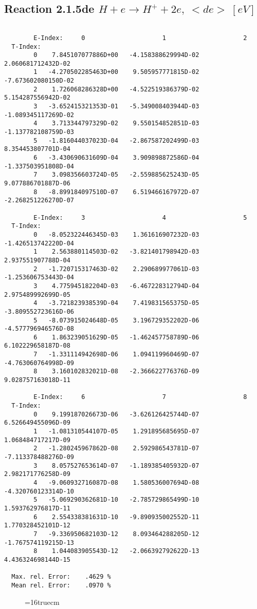 \documentclass[12pt]{article}
\begin{document}
\newpage

\subsection{
Reaction 2.1.5de  $ H + e \rightarrow H^+ + 2e, \   <de> \ [eV]$}


\begin{small}\begin{verbatim}

        E-Index:     0                     1                     2
  T-Index:
        0    7.845107077886D+00   -4.158388629994D-02    2.060681712432D-02
        1   -4.270502285463D+00    9.505957771815D-02   -7.673602080150D-02
        2    1.726068286328D+00   -4.522519386379D-02    5.154287556942D-02
        3   -3.652415321353D-01   -5.349008403944D-03   -1.089345117269D-02
        4    3.713344797329D-02    9.550154852851D-03   -1.137782108759D-03
        5   -1.816044037023D-04   -2.867587202499D-03    8.354453807701D-04
        6   -3.430690631609D-04    3.909898872586D-04   -1.337503951808D-04
        7    3.098356603724D-05   -2.559885625243D-05    9.077886701887D-06
        8   -8.899184097510D-07    6.519466167972D-07   -2.268251226270D-07

        E-Index:     3                     4                     5
  T-Index:
        0   -8.052322446345D-03    1.361616907232D-03   -1.426513742220D-04
        1    2.563880114503D-02   -3.821401798942D-03    2.937551907788D-04
        2   -1.720715317463D-02    2.290689977061D-03   -1.253606753443D-04
        3    4.775945182204D-03   -6.467228312794D-04    2.975489992699D-05
        4   -3.721823938539D-04    7.419831565375D-05   -3.809552723616D-06
        5   -8.073915024648D-05    3.196729352202D-06   -4.577796946576D-08
        6    1.863239051629D-05   -1.462457758789D-06    6.102229658187D-08
        7   -1.331114942698D-06    1.094119960469D-07   -4.763060764998D-09
        8    3.160102832021D-08   -2.366622776376D-09    9.028757163018D-11

        E-Index:     6                     7                     8
  T-Index:
        0    9.199187026673D-06   -3.626126425744D-07    6.526649455096D-09
        1   -1.081310544107D-05    1.291895685695D-07    1.068484717217D-09
        2   -1.280245967862D-08    2.592986543781D-07   -7.113378488276D-09
        3    8.057527653614D-07   -1.189385405932D-07    2.982171776258D-09
        4   -9.060932716087D-08    1.580536007694D-08   -4.320760123314D-10
        5   -5.069290362681D-10   -2.785729865499D-10    1.593762976817D-11
        6    2.554338381631D-10   -9.890935002552D-11    1.770328452101D-12
        7   -9.336950682103D-12    8.093464288205D-12   -1.767574119215D-13
        8    1.044083905543D-12   -2.066392792622D-13    4.436324698144D-15

  Max. rel. Error:    .4629 %
  Mean rel. Error:    .0970 %

\end{verbatim}\end{small}
\begin{figure} \label{2.1.5li2}
\epsfxsize=16truecm
\end{figure}
\newpage
\end{document}
